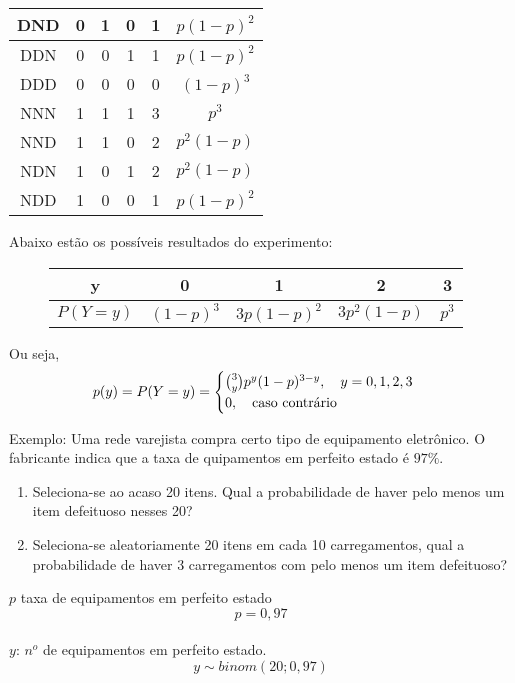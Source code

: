 \documentclass[11pt,a4paper]{book}
\begin{document}
\begin{description}
\begin{tabular}{c c c c c c }
       DND& 0 & 1 & 0 & 1 & $p(1-p)^2$\\\midrule

       DDN& 0 & 0 & 1 & 1 & $p(1-p)^2$\\\midrule

       DDD&  0 & 0 & 0 & 0 & $(1-p)^3$\\\midrule

       NNN&   1 & 1 & 1 & 3 & $p^3$\\\midrule

       NND& 1 & 1 & 0 & 2 & $p^2(1-p)$\\\midrule

       NDN& 1 & 0 & 1 & 2 & $p^2(1-p)$\\\midrule

       NDD& 1 & 0 & 0 & 1 & $p(1-p)^2$ \\ \bottomrule

     \end{tabular}

     Abaixo estão os possíveis resultados do experimento:


     \begin{figure} 
       \centering
       \begin{tabular}{c c c c c}
         \toprule
         y&0&1&2&3\\ \midrule
         $P(Y=y)$&$(1-p)^3$&$3p(1-p)^2$&$3p^2(1-p)$&$p^3$\\ \bottomrule
       \end{tabular}
       \label{fig:127}
     \end{figure}
      Ou seja,
      \begin{align*}
        p(y)=P(Y=y)=\begin{cases}
          \binom{3}{y}p^y (1-p)^{3-y}, \text{\quad}y=0,1,2,3\\
          0, \text{\quad caso contrário}
        \end{cases}
      \end{align*}
    \item{Exemplo}: Uma rede varejista compra certo tipo de equipamento eletrônico. O 
      fabricante indica que a taxa de quipamentos em perfeito estado é $97\%$.
      \begin{enumerate}[label=(\alph*)]
        \item Seleciona-se ao acaso 20 itens. Qual a probabilidade de haver pelo menos 
          um item defeituoso nesses 20?
        \item Seleciona-se aleatoriamente 20 itens em cada 10 carregamentos, qual a 
          probabilidade de haver 3 carregamentos com pelo menos um item defeituoso?
      \end{enumerate}
      $p$ taxa de equipamentos em perfeito estado\\
      $$p=0,97$$\\
      $y$: $n^o$ de equipamentos em perfeito estado.\\
      $$y \sim binom(20;0,97)$$\\


\end{description}
\end{document}

